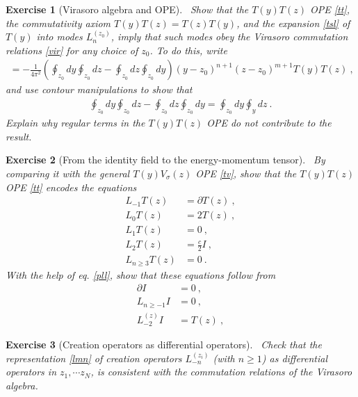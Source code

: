 \documentclass[12pt, a4paper, notitlepage, twoside]{report}
\numberwithin{equation}{section}
\theoremstyle{break}
\newtheorem{exo}{Exercise}[chapter]
\begin{document}
\begin{exo}[Virasoro algebra and OPE] 
~\label{exott}
Show that the $T(y)T(z)$ OPE \eqref{tt}, the commutativity axiom $T(y)T(z) = T(z)T(y)$, and the expansion \eqref{tsl} of $T(y)$ into modes $L_n^{(z_0)}$, imply that such modes obey the Virasoro commutation relations \eqref{vir} for any choice of $z_0$.
To do this, write 
\begin{align}
 [L_n^{(z_0)},L_m^{(z_0)}] = -\frac{1}{4\pi^2} \left(\oint_{z_0} dy \oint_{z_0} dz - \oint_{z_0} dz \oint_{z_0} dy\right) (y-z_0)^{n+1}(z-z_0)^{m+1} T(y)T(z)\ ,
\end{align}
and use contour manipulations to show that 
\begin{align}
 \oint_{z_0} dy \oint_{z_0} dz - \oint_{z_0} dz \oint_{z_0} dy = \oint_{z_0} dy \oint_y dz\ .
\end{align}
Explain why regular terms in the $T(y)T(z)$ OPE do not contribute to the result.
\end{exo}

\begin{exo}[From the identity field to the energy-momentum tensor]
 ~\label{exoit}
By comparing it with the general $T(y)V_\sigma(z)$ OPE \eqref{tv}, show that the $T(y)T(z)$ OPE \eqref{tt} encodes the equations
\begin{align}
 L_{-1}T(z) &= \partial T(z) \ ,
\label{lmt}
\\
L_0 T(z) &= 2 T(z)\ ,
\\
L_1 T(z) &= 0 \ ,
\\
L_2 T(z) &= \frac{c}{2} I\ ,
\\
L_{n\geq 3} T(z) &= 0 \ .
\label{lgt}
\end{align}
With the help of eq. \eqref{pll}, show that these equations follow from 
\begin{align}
 \partial I & = 0\ ,
\label{piz}
\\
 L_{n\geq -1} I& = 0\ ,
\\
L_{-2}^{(z)}I & = T(z)\ ,
\label{let}
\end{align}
\end{exo}


\begin{exo}[Creation operators as differential operators]
 ~\label{exodma}
 Check that the representation \eqref{lmn} of creation operators $L_{-n}^{(z_i)}$ (with $n\geq 1$) as differential operators in $z_1,\cdots z_N$, is consistent with the commutation relations of the Virasoro algebra. 
\end{exo}
\end{document}

